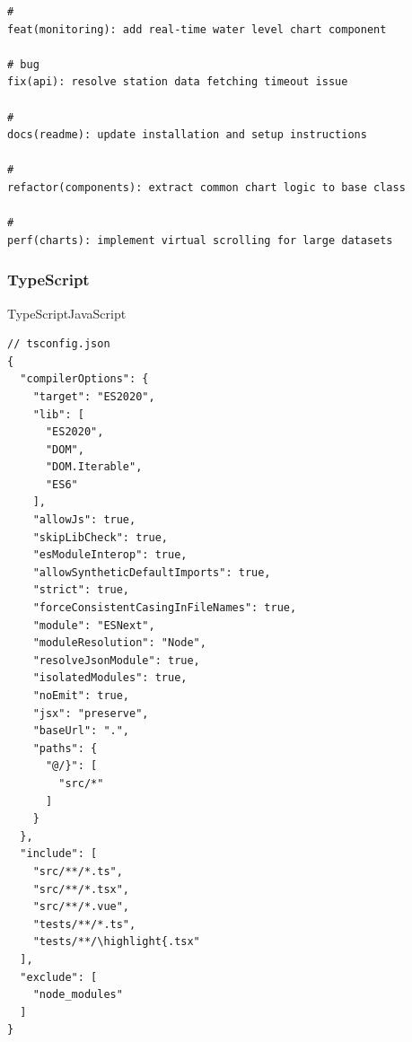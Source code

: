 \important{}

\begin{lstlisting}[style=terminal]
# 
feat(monitoring): add real-time water level chart component

# bug  
fix(api): resolve station data fetching timeout issue

# 
docs(readme): update installation and setup instructions

# 
refactor(components): extract common chart logic to base class

# 
perf(charts): implement virtual scrolling for large datasets
\end{lstlisting}

\hypertarget{typescript}{%
\subsubsection{TypeScript}\label{typescript}}

TypeScriptJavaScript


\begin{lstlisting}[style=json]
// tsconfig.json
{
  "compilerOptions": {
    "target": "ES2020",
    "lib": [
      "ES2020",
      "DOM",
      "DOM.Iterable",
      "ES6"
    ],
    "allowJs": true,
    "skipLibCheck": true,
    "esModuleInterop": true,
    "allowSyntheticDefaultImports": true,
    "strict": true,
    "forceConsistentCasingInFileNames": true,
    "module": "ESNext",
    "moduleResolution": "Node",
    "resolveJsonModule": true,
    "isolatedModules": true,
    "noEmit": true,
    "jsx": "preserve",
    "baseUrl": ".",
    "paths": {
      "@/}": [
        "src/*"
      ]
    }
  },
  "include": [
    "src/**/*.ts",
    "src/**/*.tsx", 
    "src/**/*.vue",
    "tests/**/*.ts",
    "tests/**/\highlight{.tsx"
  ],
  "exclude": [
    "node_modules"
  ]
}
\end{lstlisting}


